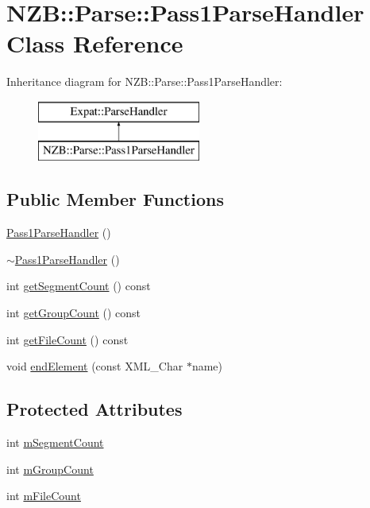 \hypertarget{class_n_z_b_1_1_parse_1_1_pass1_parse_handler}{}\section{N\+ZB\+:\+:Parse\+:\+:Pass1\+Parse\+Handler Class Reference}
\label{class_n_z_b_1_1_parse_1_1_pass1_parse_handler}
Inheritance diagram for N\+ZB\+:\+:Parse\+:\+:Pass1\+Parse\+Handler\+:\begin{figure}[H]
\begin{center}
\leavevmode
\includegraphics[height=2.000000cm]{class_n_z_b_1_1_parse_1_1_pass1_parse_handler}
\end{center}
\end{figure}
\subsection*{Public Member Functions}
\begin{DoxyCompactItemize}
\item 
\hyperlink{class_n_z_b_1_1_parse_1_1_pass1_parse_handler_a1be458058a48e975914ed8f418828a6b}{Pass1\+Parse\+Handler} ()
\item 
\hyperlink{class_n_z_b_1_1_parse_1_1_pass1_parse_handler_a1dbe3658043ecc45b5fc8aabf923ebf8}{$\sim$\+Pass1\+Parse\+Handler} ()
\item 
int \hyperlink{class_n_z_b_1_1_parse_1_1_pass1_parse_handler_a4e04669e3a8fc7d4c07f7e308de489e5}{get\+Segment\+Count} () const
\item 
int \hyperlink{class_n_z_b_1_1_parse_1_1_pass1_parse_handler_a5ba1c886f45e0340dc22075f99ff51df}{get\+Group\+Count} () const
\item 
int \hyperlink{class_n_z_b_1_1_parse_1_1_pass1_parse_handler_ae61ae9069c299a17793e845c6ab1bbe5}{get\+File\+Count} () const
\item 
void \hyperlink{class_n_z_b_1_1_parse_1_1_pass1_parse_handler_afbdd1eaa80a10f66cba06a260fd9e7a1}{end\+Element} (const X\+M\+L\+\_\+\+Char $\ast$name)
\end{DoxyCompactItemize}
\subsection*{Protected Attributes}
\begin{DoxyCompactItemize}
\item 
int \hyperlink{class_n_z_b_1_1_parse_1_1_pass1_parse_handler_a4160b3aae47236e9b34418de1d162152}{m\+Segment\+Count}
\item 
int \hyperlink{class_n_z_b_1_1_parse_1_1_pass1_parse_handler_a7ad7ebf07c7b22638e26d747b3bd9281}{m\+Group\+Count}
\item 
int \hyperlink{class_n_z_b_1_1_parse_1_1_pass1_parse_handler_ad097bc8568270c31a3483b5488e900d4}{m\+File\+Count}
\end{DoxyCompactItemize}


